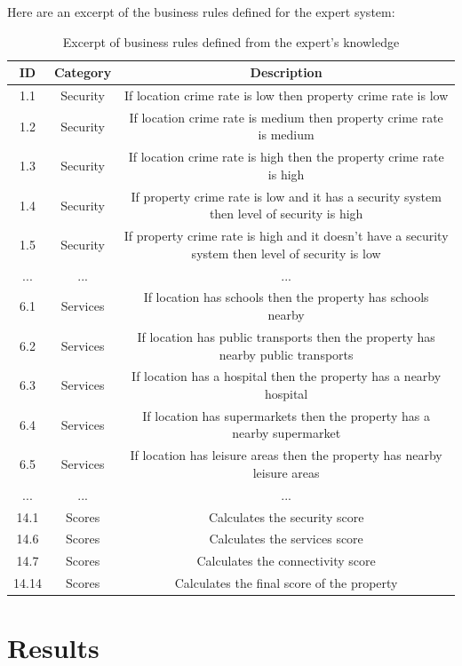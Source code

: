 \documentclass[runningheads]{llncs}
\begin{document}
Here are an excerpt of the business rules defined for the expert system:
\begin{table}[ht]
    \centering
    \begin{tabular}{c|c|c}
    \hline
    \textbf{ID} & \textbf{Category} & \textbf{Description} \\\hline
    1.1 & Security & If location crime rate is low then property crime rate is low \\\hline
    1.2 & Security & If location crime rate is medium then property crime rate is medium \\\hline
    1.3 & Security & If location crime rate is high then the property crime rate is high \\\hline
    1.4 & Security & If property crime rate is low and it has a security system then level of security is high  \\\hline
    1.5 & Security & If property crime rate is high and it doesn't have a security system then level of security is low \\\hline
    ... & ... & ... \\\hline
    6.1 & Services & If location has schools then the property has schools nearby \\\hline
    6.2 & Services & If location has public transports then the property has nearby public transports \\\hline
    6.3 & Services & If location has a hospital then the property has a nearby hospital \\\hline
    6.4 & Services & If location has supermarkets then the property has a nearby supermarket \\\hline
    6.5 & Services & If location has leisure areas then the property has nearby leisure areas \\\hline
    ... & ... & ... \\\hline
    14.1 & Scores & Calculates the security score \\\hline
    14.6 & Scores & Calculates the services score\\\hline
    14.7 & Scores & Calculates the connectivity score\\\hline
    14.14 & Scores & Calculates the final score of the property \\\hline
    \end{tabular}
    \caption{Excerpt of business rules defined from the expert's knowledge}
    \label{tab:rules}
\end{table}

\section{Results}
\end{document}
